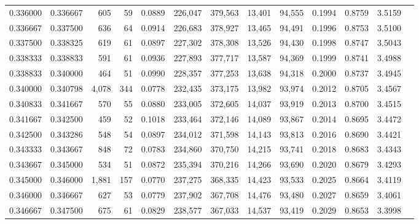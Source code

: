 \begin{tabular}{rrrrrrrrrrrrr}
0.336000 & 0.336667 &   605 &  59 &                                     0.0889 & 226,047 & 379,563 &  13,401 &  94,555 & 0.1994 & 0.8759 & 3.5159 \\
0.336667 & 0.337500 &   636 &  64 &                                     0.0914 & 226,683 & 378,927 &  13,465 &  94,491 & 0.1996 & 0.8753 & 3.5100 \\
0.337500 & 0.338325 &   619 &  61 &                                     0.0897 & 227,302 & 378,308 &  13,526 &  94,430 & 0.1998 & 0.8747 & 3.5043 \\
0.338333 & 0.338833 &   591 &  61 &                                     0.0936 & 227,893 & 377,717 &  13,587 &  94,369 & 0.1999 & 0.8741 & 3.4988 \\
0.338833 & 0.340000 &   464 &  51 &                                     0.0990 & 228,357 & 377,253 &  13,638 &  94,318 & 0.2000 & 0.8737 & 3.4945 \\
0.340000 & 0.340798 & 4,078 & 344 &                                     0.0778 & 232,435 & 373,175 &  13,982 &  93,974 & 0.2012 & 0.8705 & 3.4567 \\
0.340833 & 0.341667 &   570 &  55 &                                     0.0880 & 233,005 & 372,605 &  14,037 &  93,919 & 0.2013 & 0.8700 & 3.4515 \\
0.341667 & 0.342500 &   459 &  52 &                                     0.1018 & 233,464 & 372,146 &  14,089 &  93,867 & 0.2014 & 0.8695 & 3.4472 \\
0.342500 & 0.343286 &   548 &  54 &                                     0.0897 & 234,012 & 371,598 &  14,143 &  93,813 & 0.2016 & 0.8690 & 3.4421 \\
0.343333 & 0.343667 &   848 &  72 &                                     0.0783 & 234,860 & 370,750 &  14,215 &  93,741 & 0.2018 & 0.8683 & 3.4343 \\
0.343667 & 0.345000 &   534 &  51 &                                     0.0872 & 235,394 & 370,216 &  14,266 &  93,690 & 0.2020 & 0.8679 & 3.4293 \\
0.345000 & 0.346000 & 1,881 & 157 &                                     0.0770 & 237,275 & 368,335 &  14,423 &  93,533 & 0.2025 & 0.8664 & 3.4119 \\
0.346000 & 0.346667 &   627 &  53 &                                     0.0779 & 237,902 & 367,708 &  14,476 &  93,480 & 0.2027 & 0.8659 & 3.4061 \\
0.346667 & 0.347500 &   675 &  61 &                                     0.0829 & 238,577 & 367,033 &  14,537 &  93,419 & 0.2029 & 0.8653 & 3.3998 \\

\end{tabular}
